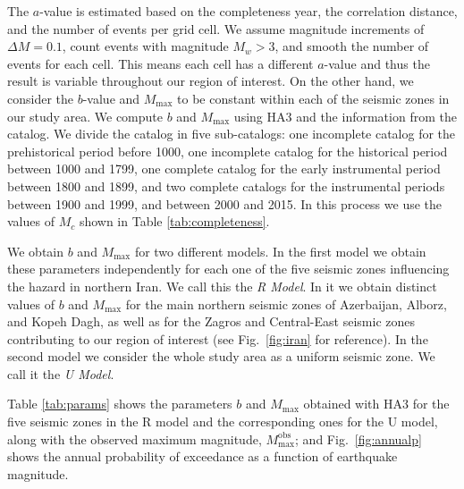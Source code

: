 The $a$-value is estimated based on the completeness year, the correlation distance, and the number of events per grid cell. We assume magnitude increments of $\Delta M = 0.1$, count events with magnitude $M_w > 3$, and smooth the number of events for each cell. This means each cell has a different $a$-value and thus the result is variable throughout our region of interest. On the other hand, we consider the $b$-value and $M_{\max}$ to be constant within each of the seismic zones in our study area. We compute $b$ and $M_{\max}$ using HA3 and the information from the catalog.  We divide the catalog in five sub-catalogs: one incomplete catalog for the prehistorical period before 1000, one incomplete catalog for the historical period between 1000 and 1799, one complete catalog for the early instrumental period between 1800 and 1899, and two complete catalogs for the instrumental periods between 1900 and 1999, and between 2000 and 2015. In this process we use the values of $M_c$ shown in Table \ref{tab:completeness}.

We obtain $b$ and $M_{\max}$ for two different models. In the first model we obtain these parameters independently for each one of the five seismic zones influencing the hazard in northern Iran. We call this the \textit{R Model}. In it we obtain distinct values of $b$ and $M_{\max}$ for the main northern seismic zones of Azerbaijan, Alborz, and Kopeh Dagh, as well as for the Zagros and Central-East seismic zones contributing to our region of interest (see Fig.~\ref{fig:iran} for reference). In the second model we consider the whole study area as a uniform seismic zone. We call it the \textit{U Model}. 

Table \ref{tab:params} shows the parameters $b$ and $M_{\max}$ obtained with HA3 for the five seismic zones in the R model and the corresponding ones for the U model, along with the observed maximum magnitude, $M_{\max}^{\mathrm{obs}}$; and Fig.~\ref{fig:annualp} shows the annual probability of exceedance as a function of earthquake magnitude.
